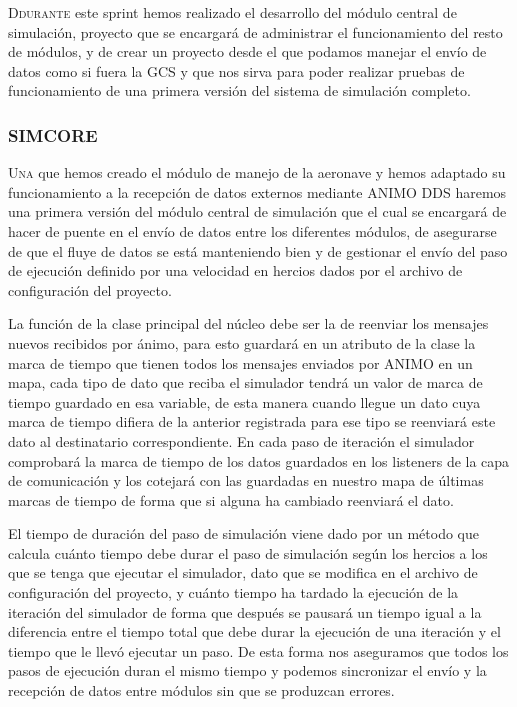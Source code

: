 \documentclass[12pt,a4paper,spanish]{book} %
\begin{document}
\lettrine{D}{durante} este sprint hemos realizado el desarrollo del módulo central de simulación, proyecto que se encargará de administrar el funcionamiento del resto de módulos, y de crear un proyecto desde el que podamos manejar el envío de datos como si fuera la GCS y que nos sirva para poder realizar pruebas de funcionamiento de una primera versión del sistema de simulación completo.

\subsubsection{SIMCORE}

\lettrine{U}{na} que hemos creado el módulo de manejo de la aeronave y hemos adaptado su funcionamiento a la recepción de datos externos mediante ANIMO DDS haremos una primera versión del módulo central de simulación que el cual se encargará de hacer de puente en el envío de datos entre los diferentes módulos, de asegurarse de que el fluye de datos se está manteniendo bien y de gestionar el envío del paso de ejecución definido por una velocidad en hercios dados por el archivo de configuración del proyecto.

La función de la clase principal del núcleo debe ser la de reenviar los mensajes nuevos recibidos por ánimo, para esto guardará en un atributo de la clase la marca de tiempo que tienen todos los mensajes enviados por ANIMO en un mapa, cada tipo de dato que reciba el simulador tendrá un valor de marca de tiempo guardado en esa variable, de esta manera cuando llegue un dato cuya marca de tiempo difiera de la anterior registrada para ese tipo se reenviará este dato al destinatario correspondiente. En cada paso de iteración el simulador comprobará la marca de tiempo de los datos guardados en los listeners de la capa de comunicación y los cotejará con las guardadas en nuestro mapa de últimas marcas de tiempo de forma que si alguna ha cambiado reenviará el dato.

El tiempo de duración del paso de simulación viene dado por un método que calcula cuánto tiempo debe durar el paso de simulación según los hercios a los que se tenga que ejecutar el simulador, dato que se modifica en el archivo de configuración del proyecto, y cuánto tiempo ha tardado la ejecución de la iteración del simulador de forma que después se pausará un tiempo igual a la diferencia entre el tiempo total que debe durar la ejecución de una iteración y el tiempo que le llevó ejecutar un paso. De esta forma nos aseguramos que todos los pasos de ejecución duran el mismo tiempo y podemos sincronizar el envío y la recepción de datos entre módulos sin que se produzcan errores.
\end{document}
